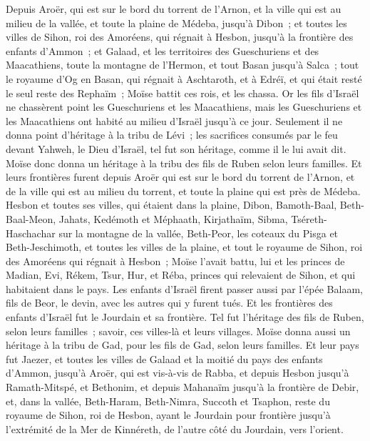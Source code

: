 \begin{multicols}{2}
Depuis Aroër, qui est sur le bord du torrent de l'Arnon, et la ville qui est au milieu de la vallée, et toute la plaine de Médeba, jusqu'à Dibon~;
et toutes les villes de Sihon, roi des Amoréens, qui régnait à Hesbon, jusqu'à la frontière des enfants d'Ammon~;
et Galaad, et les territoires des Gueschuriens et des Maacathiens, toute la montagne de l'Hermon, et tout Basan jusqu'à Salca~;
tout le royaume d'Og en Basan, qui régnait à Aschtaroth, et à Edréï, et qui était resté le seul reste des Rephaïm~; Moïse battit ces rois, et les chassa.
Or les fils d'Israël ne chassèrent point les Gueschuriens et les Maacathiens, mais les Gueschuriens et les Maacathiens ont habité au milieu d'Israël jusqu'à ce jour.
Seulement il ne donna point d'héritage à la tribu de Lévi~; les sacrifices consumés par le feu devant Yahweh, le Dieu d'Israël, tel fut son héritage, comme il le lui avait dit.
Moïse donc donna un héritage à la tribu des fils de Ruben selon leurs familles.
Et leurs frontières furent depuis Aroër qui est sur le bord du torrent de l'Arnon, et de la ville qui est au milieu du torrent, et toute la plaine qui est près de Médeba.
Hesbon et toutes ses villes, qui étaient dans la plaine, Dibon, Bamoth-Baal, Beth-Baal-Meon,
Jahats, Kedémoth et Méphaath,
Kirjathaïm, Sibma, Tséreth-Haschachar sur la montagne de la vallée,
Beth-Peor, les coteaux du Pisga et Beth-Jeschimoth,
et toutes les villes de la plaine, et tout le royaume de Sihon, roi des Amoréens qui régnait à Hesbon~; Moïse l'avait battu, lui et les princes de Madian, Evi, Rékem, Tsur, Hur, et Réba, princes qui relevaient de Sihon, et qui habitaient dans le pays.
Les enfants d'Israël firent passer aussi par l'épée Balaam, fils de Beor, le devin, avec les autres qui y furent tués.
Et les frontières des enfants d'Israël fut le Jourdain et sa frontière. Tel fut l'héritage des fils de Ruben, selon leurs familles~; savoir, ces villes-là et leurs villages.
Moïse donna aussi un héritage à la tribu de Gad, pour les fils de Gad, selon leurs familles.
Et leur pays fut Jaezer, et toutes les villes de Galaad et la moitié du pays des enfants d'Ammon, jusqu'à Aroër, qui est vis-à-vis de Rabba,
et depuis Hesbon jusqu'à Ramath-Mitspé, et Bethonim, et depuis Mahanaïm jusqu'à la frontière de Debir,
et, dans la vallée, Beth-Haram, Beth-Nimra, Succoth et Tsaphon, reste du royaume de Sihon, roi de Hesbon, ayant le Jourdain pour frontière jusqu'à l'extrémité de la Mer de Kinnéreth, de l'autre côté du Jourdain, vers l'orient.

\end{multicols}
